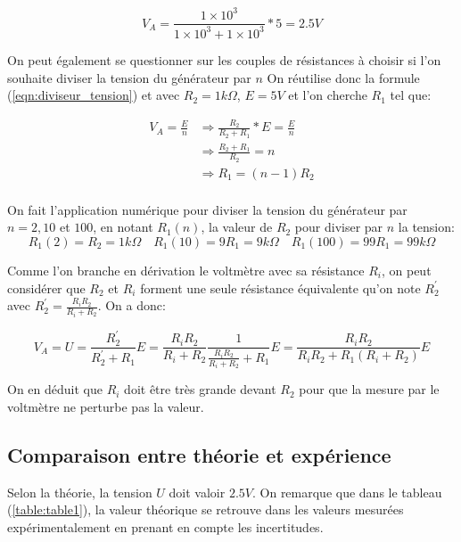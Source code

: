 \documentclass[10pt]{article}
\begin{document}
\begin{equation}
    V_A = \frac{1 \times 10^3}{1 \times 10^3 + 1 \times 10^3} * 5 = 2.5V
\end{equation}

On peut également se questionner sur les couples de résistances à choisir si l'on souhaite diviser la tension du générateur par $n$
On réutilise donc la formule (\ref{eqn:diviseur_tension}) et avec $R_2 = 1k\Omega$, $E = 5V$ et l'on cherche $R_1$ tel que:

\begin{equation}
    \begin{split}
        V_A = \frac{E}{n} & \Rightarrow \frac{R_2}{R_2 + R_1} * E = \frac{E}{n} \\
        & \Rightarrow \frac{R_2 + R_1}{R_2} = n \\
        & \Rightarrow R_1 = (n-1)R_2 \\
    \end{split}
\end{equation}

On fait l'application numérique pour diviser la tension du générateur par $n = 2, 10$ et $100$, en notant $R_1(n)$, la valeur de $R_2$
pour diviser par $n$ la tension:
\begin{equation}
    R_1(2) = R_2 = 1k \Omega \quad R_1(10) = 9R_1 = 9k \Omega \quad R_1(100) = 99 R_1 = 99 k\Omega
\end{equation}

Comme l'on branche en dérivation le voltmètre avec sa résistance $R_i$, on peut considérer que $R_2$ et $R_i$ forment une seule résistance équivalente
qu'on note $R_2^{'}$ avec $R_2^{'} = \frac{R_iR_2}{R_i + R_2}$. On a donc: 

\begin{equation}
    V_A = U = \frac{R_2^{'}}{R_2^{'} + R_1} E = \frac{R_iR_2}{R_i + R_2} \frac{1}{\frac{R_iR_2}{R_i + R_2} + R_1} E = \frac{R_iR_2}{R_iR_2 + R_1(R_i + R_2)} E 
\end{equation}

On en déduit que $R_i$ doit être très grande devant $R_2$ pour que la mesure par le voltmètre ne perturbe pas la valeur.

\subsection{Comparaison entre théorie et expérience}
Selon la théorie, la tension $U$ doit valoir $2.5V$. On remarque que dans le tableau (\ref{table:table1}), la valeur théorique se retrouve
dans les valeurs mesurées expérimentalement en prenant en compte les incertitudes.
\end{document}
